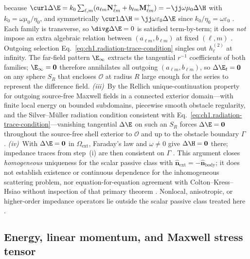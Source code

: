 because $\curl\Delta\E=k_0\sum_{\ell,m}(a_{\ell m}\mathbf N_{\ell m}^{+}+b_{\ell m}\mathbf M_{\ell m}^{+})=-\jj\omega\mu_0\Delta\H$ with $k_0=\omega\mu_0/\eta_0$, and symmetrically $\curl\Delta\H=\jj\omega\varepsilon_0\Delta\E$ since $k_0/\eta_0=\omega\varepsilon_0$ \cite{stratton1941,harrington2001}. Each family is transverse, so $\divg\Delta\E=0$ is satisfied term-by-term; it does \emph{not} impose an extra algebraic relation between $(a_{\ell m},b_{\ell m})$ at fixed $(\ell,m)$ \cite{stratton1941,harrington2001}. Outgoing selection Eq.~\eqref{eq:ch1.radiation-trace-condition} singles out $h_\ell^{(2)}$ at infinity. The far-field pattern $\E_\infty$ extracts the tangential $r^{-1}$ coefficients of both families; $\E_\infty=\mathbf{0}$ therefore annihilates all outgoing $(a_{\ell m},b_{\ell m})$, so $\Delta\E_t=\mathbf{0}$ on any sphere $S_R$ that encloses $\mathcal{O}$ at radius $R$ large enough for the series to represent the difference field. \emph{(iii)}~By the Rellich unique-continuation property for outgoing source-free Maxwell fields in a connected exterior domain---with finite local energy on bounded subdomains, piecewise smooth obstacle regularity, and the Silver--M\"uller radiation condition consistent with Eq.~\eqref{eq:ch1.radiation-trace-condition}---vanishing tangential $\Delta\E$ on such an $S_R$ forces $\Delta\E=\mathbf{0}$ throughout the source-free shell exterior to $\mathcal{O}$ and up to the obstacle boundary $\Gamma$ \cite{sommerfeld1949,harrington2001}. \emph{(iv)}~With $\Delta\E=\mathbf{0}$ in $\Omega_{\mathrm{ext}}$, Faraday's law and $\omega\neq0$ give $\Delta\H=\mathbf{0}$ there; impedance traces from step~(i) are then consistent on $\Gamma$ \cite{stratton1941,harrington2001}. This argument closes \emph{homogeneous} uniqueness for the scalar passive class with $\hat{\mathbf{n}}_{\mathrm{ext}}=-\hat{\mathbf{n}}_{\mathrm{body}}$; it does not establish existence or continuous dependence for the inhomogeneous scattering problem, nor equation-for-equation agreement with Colton--Kress--Hsiao without inspection of that primary theorem \cite{colton1981impedance}. Nonlocal, anisotropic, or higher-order impedance operators lie outside the scalar passive class treated here \cite{stratton1941}.
\label{prop:ch1.uniqueness-passive-closure}
\label{eq:ch1.uniqueness-condition-index}

\subsection{Energy, linear momentum, and Maxwell stress tensor}
\label{sec:ch01.1.4}

